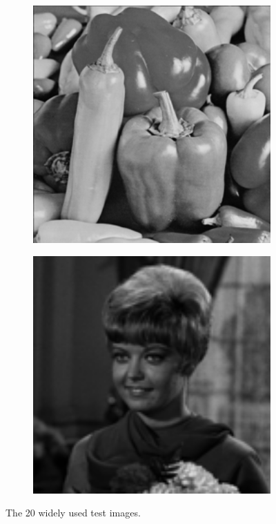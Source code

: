 \begin{figure}
\begin{subfigure}[b]{0.09\textwidth}
    \end{subfigure}
    \hfill
    \begin{subfigure}[b]{0.09\textwidth}
        \centering
        \includegraphics[width=1\textwidth]{images/pgpd/peppers.png}
    \end{subfigure}
    \hfill
    \begin{subfigure}[b]{0.09\textwidth}
        \centering
        \includegraphics[width=1\textwidth]{images/pgpd/zelda.png}
    \end{subfigure}
    \caption{The 20 widely used test images.}
    \label{fig2-5}
\end{figure}


